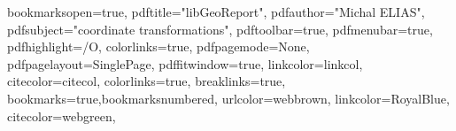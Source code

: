 \hypersetup
{
bookmarksopen=true,
pdftitle="libGeoReport",
pdfauthor="Michal ELIAS",
pdfsubject="coordinate transformations",
pdftoolbar=true, %
pdfmenubar=true, %
pdfhighlight=/O, %
colorlinks=true, %
pdfpagemode=None, %
pdfpagelayout=SinglePage, %
pdffitwindow=true, %
linkcolor=linkcol, %
citecolor=citecol, %
colorlinks=true, breaklinks=true, bookmarks=true,bookmarksnumbered,
urlcolor=webbrown, linkcolor=RoyalBlue, citecolor=webgreen, %
}
%
%
